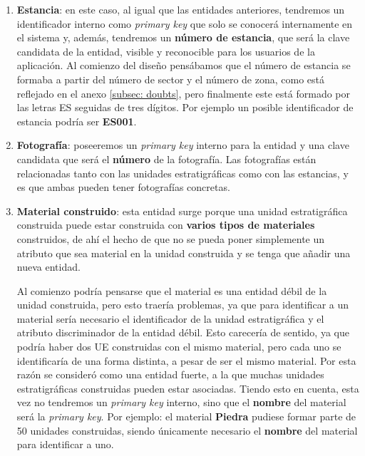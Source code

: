 \begin{enumerate}
        \item \textbf{\gls{Estancia}}: en este caso, al igual que las entidades anteriores,
        tendremos un identificador interno como \textit{primary key} que solo se conocerá
        internamente en el sistema y, además, tendremos un \textbf{número de estancia}, que será
        la clave candidata de la entidad, visible y reconocible para los usuarios de la aplicación.
        Al comienzo del diseño pensábamos que el número de estancia se formaba a partir del número
        de sector y el número de zona, como está reflejado en el anexo \ref{subsec: doubts},
        pero finalmente este está formado por las letras ES seguidas de tres dígitos. Por ejemplo
        un posible identificador de estancia podría ser \textbf{ES001}.

        \item \textbf{Fotografía}: poseeremos un \textit{primary key} interno para la entidad y una
        clave candidata que será el \textbf{número} de la fotografía. Las fotografías están
        relacionadas tanto con las unidades estratigráficas como con las estancias, y es que 
        ambas pueden tener fotografías concretas.
        
        \item \textbf{Material construido}: esta entidad surge porque una unidad estratigráfica
        construida puede estar construida con \textbf{varios tipos de materiales} construidos,
        de ahí el hecho de que no se pueda poner simplemente un atributo que sea material en
        la unidad construida y se tenga que añadir una nueva entidad.

        Al comienzo podría pensarse que el material es una entidad débil de la unidad
        construida, pero esto traería problemas, ya que para identificar a un material sería
        necesario el identificador de la unidad estratigráfica y el atributo discriminador de
        la entidad débil. Esto carecería de sentido, ya que podría haber dos UE construidas
        con el mismo material, pero cada uno se identificaría de una forma distinta, a pesar
        de ser el mismo material. Por esta razón se consideró como una entidad fuerte, a la
        que muchas unidades estratigráficas construidas pueden estar asociadas. Tiendo esto
        en cuenta, esta vez no tendremos un \textit{primary key} interno, sino que el
        \textbf{nombre} del material será la \textit{primary key}. Por ejemplo: el material
        \textbf{Piedra} pudiese formar parte de 50 unidades construidas, siendo únicamente
        necesario el \textbf{nombre} del material para identificar a uno.
        

\end{enumerate}
